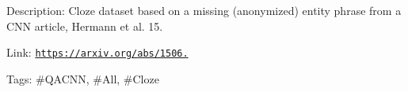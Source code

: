 Description\+: Cloze dataset based on a missing (anonymized) entity phrase from a C\+NN article, Hermann et al. \textquotesingle{}15.

Link\+: \href{https://arxiv.org/abs/1506.03340}{\tt https\+://arxiv.\+org/abs/1506.}

Tags\+: \#\+Q\+A\+C\+NN, \#\+All, \#\+Cloze 